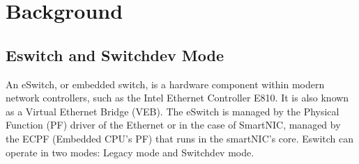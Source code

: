 \documentclass[letterpaper]{article}
\begin{document}

\section{Background}

\subsection{Eswitch and Switchdev Mode}
An eSwitch, or embedded switch, is a hardware component within modern network
controllers, such as the Intel Ethernet Controller E810. It is also known as
a Virtual Ethernet Bridge (VEB). The eSwitch is managed by the Physical Function (PF)
driver of the Ethernet or in the case of SmartNIC, managed by the ECPF (Embedded
CPU's PF) that runs in the smartNIC's core. Eswitch can operate in two modes:
Legacy mode and Switchdev mode.
\end{document}
